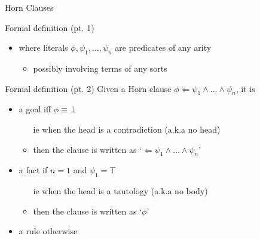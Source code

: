 \documentclass[presentation]{beamer}\mode<presentation>{\usetheme{AMSBolognaFC}}
\begin{document}
\begin{frame}[allowframebreaks]{Horn Clauses}
\begin{block}{Formal definition (pt. 1)}
\begin{itemize}
\begin{itemize}
            \end{itemize}
            \item where literals $\phi, \psi_1, \ldots, \psi_n$ are \alert{predicates} of any arity
            \begin{itemize}
                \item possibly involving terms of any sorts
            \end{itemize}
        \end{itemize}
    \end{block}
    \begin{block}{Formal definition (pt. 2)}
        Given a Horn clause $\phi \Leftarrow \psi_1 \wedge \ldots \wedge \psi_n$, it is
        \begin{itemize}
            \item a \alert{goal} iff $\phi \equiv \bot$
            \begin{itemize}
                \item[ie] when the head is a contradiction (a.k.a no head)
                \item then the clause is written as `$\Leftarrow \psi_1 \wedge \ldots \wedge \psi_n$'
            \end{itemize}

            \item a \alert{fact} if $n = 1$ and $\psi_1 = \top$
            \begin{itemize}
                \item[ie] when the head is a tautology (a.k.a no body)
                \item then the clause is written as `$\phi$'
            \end{itemize}

            \item a \alert{rule} otherwise
        \end{itemize}
    \end{block}
\end{frame}
\end{document}
